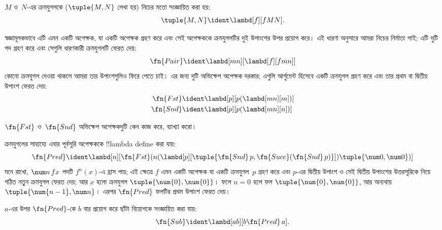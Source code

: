 \documentclass[../../../include/open-logic-section]{subfiles}
\begin{document}

\begin{defn}
$M$ ও~$N$-এর ক্রমযুগলকে ($\tuple{M,N}$ লেখা হয়) নিচের মতো সংজ্ঞায়িত
করা হয়:
\[
\tuple{M,N} \ident \lambd[f][fMN].
\]
\end{defn}

স্বজ্ঞামূলকভাবে এটি এমন একটি অপেক্ষক, যা একটি অপেক্ষক গ্রহণ করে এবং
সেই অপেক্ষককে ক্রমযুগলটির দুই উপাংশের উপর প্রয়োগ করে। এই ধারণা অনুসারে
আমরা নিচের নির্মাতা পাই; এটি দুটি পদ গ্রহণ করে এবং সেগুলি ধারণকারী
ক্রমযুগলটি ফেরত দেয়:
\[
  \fn{Pair} \ident \lambd[mn][\lambd[f][fmn]]
\]
কোনো ক্রমযুগল দেওয়া থাকলে আমরা তার উপাংশগুলিও ফিরে পেতে চাই। এর জন্য
দুটি অভিক্ষেপ অপেক্ষক দরকার; এগুলি আর্গুমেন্ট হিসেবে একটি ক্রমযুগল গ্রহণ
করে এবং তার প্রথম বা দ্বিতীয় উপাংশ ফেরত দেয়:
\begin{align*}
  \fn{Fst} & \ident \lambd[p][p(\lambd[mn][m])]\\
  \fn{Snd} & \ident \lambd[p][p(\lambd[mn][n])]
\end{align*}

\begin{prob}
  $\fn{Fst}$ ও~$\fn{Snd}$ অভিক্ষেপ অপেক্ষকদুটি কেন কাজ করে, ব্যাখ্যা
  করো।
\end{prob}

ক্রমযুগলের সাহায্যে এবার পূর্বসূরি অপেক্ষককে !!{lambda define} করা যায়:
\[
  \fn{Pred} \ident \lambd[n][\fn{Fst}(n (\lambd[p][\tuple{\fn{Snd}\, {p}, \fn{Succ}(\fn{Snd}\, {p})}]) \tuple{\num 0, \num 0})]
\]
মনে রাখো, $\num n\, f x$ পদটি $f^{n}(x)$-এ হ্রাস পায়; এই ক্ষেত্রে
$f$ এমন একটি অপেক্ষক যা একটি ক্রমযুগল~$p$ গ্রহণ করে এবং $p$-এর দ্বিতীয়
উপাংশ ও সেই দ্বিতীয় উপাংশের উত্তরসূরিকে নিয়ে গঠিত নতুন ক্রমযুগল ফেরত
দেয়; আর $x$ হলো ক্রমযুগল $\tuple{\num{0}, \num{0}}$। ফলে $n=0$ হলে
ফল $\tuple{\num{0}, \num{0}}$, আর অন্যথায়
$\tuple{\num{n-1}, \num n}$। এরপর $\fn{Pred}$ ফলটির প্রথম উপাংশ ফেরত
দেয়।

$a$-এর উপর $\fn{Pred}$-কে $b$ বার প্রয়োগ করে ছাঁটা বিয়োগকে
সংজ্ঞায়িত করা যায়:
\[
\fn{Sub} \ident \lambd[ab][b \fn{Pred}\, a].
\]
\end{document}
